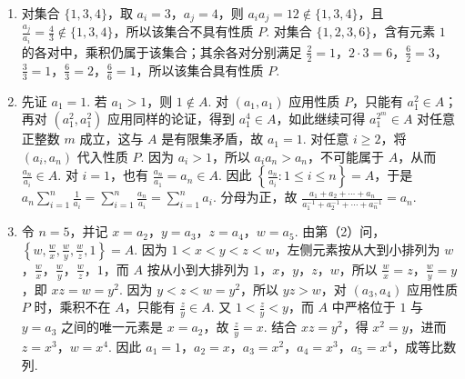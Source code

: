 \begin{solution}
\begin{enumerate}
\item 对集合 \(\{1,3,4\}\)，取 \(a_i=3\)，\(a_j=4\)，则 \(a_i a_j=12\notin\{1,3,4\}\)，且 \(\frac{a_j}{a_i}=\frac43\notin\{1,3,4\}\)，所以该集合不具有性质 \(P\). 对集合 \(\{1,2,3,6\}\)，含有元素 \(1\) 的各对中，乘积仍属于该集合；其余各对分别满足 \(\frac22=1\)，\(2\cdot3=6\)，\(\frac62=3\)，\(\frac33=1\)，\(\frac63=2\)，\(\frac66=1\)，所以该集合具有性质 \(P\).
\item 先证 \(a_1=1\). 若 \(a_1>1\)，则 \(1\notin A\). 对 \((a_1,a_1)\) 应用性质 \(P\)，只能有 \(a_1^2\in A\)；再对 \((a_1^2,a_1^2)\) 应用同样的论证，得到 \(a_1^4\in A\)，如此继续可得 \(a_1^{2^m}\in A\) 对任意正整数 \(m\) 成立，这与 \(A\) 是有限集矛盾，故 \(a_1=1\). 对任意 \(i\geqslant2\)，将 \((a_i,a_n)\) 代入性质 \(P\). 因为 \(a_i>1\)，所以 \(a_i a_n>a_n\)，不可能属于 \(A\)，从而 \(\frac{a_n}{a_i}\in A\). 对 \(i=1\)，也有 \(\frac{a_n}{a_1}=a_n\in A\). 因此 \(\left\{\frac{a_n}{a_i}:1\leqslant i\leqslant n\right\}=A\)，于是 \(a_n\sum_{i=1}^n\frac1{a_i}=\sum_{i=1}^n\frac{a_n}{a_i}=\sum_{i=1}^n a_i\). 分母为正，故 \(\frac{a_1+a_2+\cdots+a_n}{a_1^{-1}+a_2^{-1}+\cdots+a_n^{-1}}=a_n\).
\item 令 \(n=5\)，并记 \(x=a_2\)，\(y=a_3\)，\(z=a_4\)，\(w=a_5\). 由第（2）问，\(\left\{w,\frac{w}{x},\frac{w}{y},\frac{w}{z},1\right\}=A\). 因为 \(1<x<y<z<w\)，左侧元素按从大到小排列为 \(w\)，\(\frac{w}{x}\)，\(\frac{w}{y}\)，\(\frac{w}{z}\)，\(1\)，而 \(A\) 按从小到大排列为 \(1\)，\(x\)，\(y\)，\(z\)，\(w\)，所以 \(\frac{w}{x}=z\)，\(\frac{w}{y}=y\)，即 \(xz=w=y^2\). 因为 \(y<z<w=y^2\)，所以 \(yz>w\)，对 \((a_3,a_4)\) 应用性质 \(P\) 时，乘积不在 \(A\)，只能有 \(\frac{z}{y}\in A\). 又 \(1<\frac{z}{y}<y\)，而 \(A\) 中严格位于 \(1\) 与 \(y=a_3\) 之间的唯一元素是 \(x=a_2\)，故 \(\frac{z}{y}=x\). 结合 \(xz=y^2\)，得 \(x^2=y\)，进而 \(z=x^3\)，\(w=x^4\). 因此 \(a_1=1\)，\(a_2=x\)，\(a_3=x^2\)，\(a_4=x^3\)，\(a_5=x^4\)，成等比数列.
\end{enumerate}
\end{solution}
